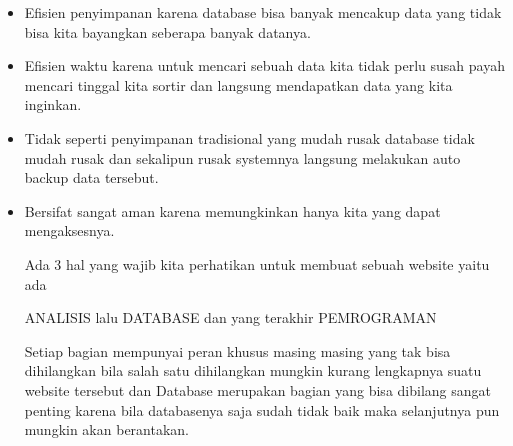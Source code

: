 \documentclass[12pt]{article}
\begin{document}
  \begin{itemize}
  \item Efisien penyimpanan karena database bisa banyak mencakup data yang tidak bisa kita bayangkan seberapa banyak datanya.
  \item Efisien waktu karena untuk mencari sebuah data kita tidak perlu susah payah mencari tinggal kita sortir dan langsung mendapatkan data yang kita inginkan.
  \item Tidak seperti penyimpanan tradisional yang mudah rusak database tidak mudah rusak dan sekalipun rusak systemnya langsung melakukan auto backup data tersebut.
  \item Bersifat sangat aman karena memungkinkan hanya kita yang dapat mengaksesnya.


Ada 3 hal yang wajib kita perhatikan untuk membuat sebuah website yaitu ada 


ANALISIS lalu DATABASE dan yang terakhir PEMROGRAMAN

Setiap bagian mempunyai peran khusus masing masing yang tak bisa dihilangkan bila salah satu dihilangkan mungkin kurang lengkapnya suatu website tersebut dan Database merupakan bagian yang bisa dibilang sangat penting karena bila databasenya saja sudah tidak baik maka selanjutnya pun mungkin akan berantakan.


\end{itemize}
\end{document}
